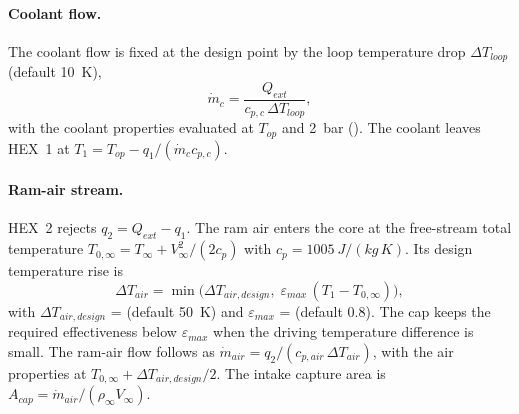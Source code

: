 \documentclass[a4paper,11pt]{article}
\newcommand{\Qext}{Q_{ext}}
\begin{document}
\paragraph{Coolant flow.} The coolant flow is fixed at the design point by the loop
temperature drop $\Delta T_{loop}$ (default \SI{10}{K}),
\begin{equation}
  \dot m_c = \frac{\Qext}{c_{p,c}\,\Delta T_{loop}},
\end{equation}
with the coolant properties evaluated at $T_{op}$ and \SI{2}{bar} ().
The coolant leaves HEX~1 at $T_1 = T_{op} - q_1/(\dot m_c c_{p,c})$.

\paragraph{Ram-air stream.} HEX~2 rejects $q_2 = \Qext - q_1$. The ram air enters the core
at the free-stream total temperature $T_{0,\infty} = T_\infty + V_\infty^2/(2c_p)$ with
$c_p = \SI{1005}{J/(kg\,K)}$. Its design temperature rise is
\begin{equation}
  \Delta T_{air} = \min\big(\Delta T_{air,design},\; \varepsilon_{max}\,(T_1 - T_{0,\infty})\big),
  \label{eq:dtair}
\end{equation}
with $\Delta T_{air,design}$ =  (default \SI{50}{K}) and
$\varepsilon_{max}$ =  (default 0.8). The cap keeps the
required effectiveness below $\varepsilon_{max}$ when the driving temperature difference is
small. The ram-air flow follows as $\dot m_{air} = q_2/(c_{p,air}\,\Delta T_{air})$, with
the air properties at $T_{0,\infty} + \Delta T_{air,design}/2$. The intake capture area
is $A_{cap} = \dot m_{air}/(\rho_\infty V_\infty)$.
\end{document}
